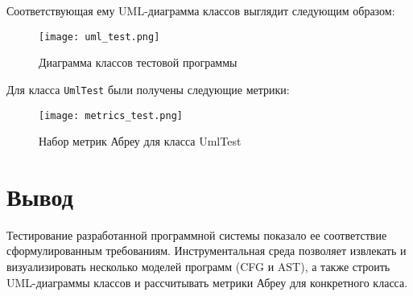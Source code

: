 Соответствующая ему UML-диаграмма классов выглядит следующим образом:

\begin{figure}[h]
    \begin{center}
        \texttt{[image: uml\_test.png]}
    \end{center}
    \caption{Диаграмма классов тестовой программы}
    \label{fig:uml_test}
\end{figure}
\newpage

Для класса \texttt{UmlTest} были получены следующие метрики:

\begin{figure}[h]
    \begin{center}
        \texttt{[image: metrics\_test.png]}
    \end{center}
    \caption{Набор метрик Абреу для класса UmlTest}
    \label{fig:metrics_test}
\end{figure}

\section{Вывод}

Тестирование разработанной программной системы показало ее соответствие
сформулированным требованиям. Инструментальная среда позволяет извлекать и
визуализировать несколько моделей программ (CFG и AST), а также строить
UML-диаграммы классов и рассчитывать метрики Абреу для конкретного класса.
